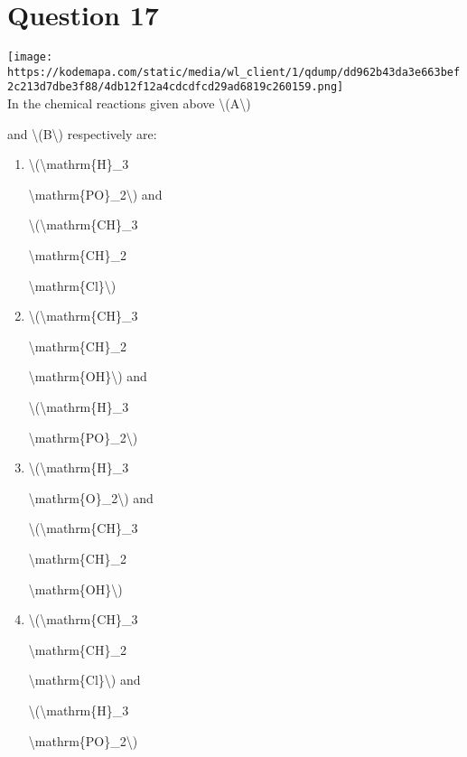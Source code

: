 \documentclass{article}
\begin{document}
\section*{Question 17}
\texttt{[image: https://kodemapa.com/static/media/wl\_client/1/qdump/dd962b43da3e663bef2c213d7dbe3f88/4db12f12a4cdcdfcd29ad6819c260159.png]}\\



In the chemical reactions given above \textbackslash(A\textbackslash)

and \textbackslash(B\textbackslash) respectively are:


\begin{enumerate}[label=(\alph*)]
\item \textbackslash(\textbackslash mathrm\{H\}\_3

\textbackslash mathrm\{PO\}\_2\textbackslash) and

\textbackslash(\textbackslash mathrm\{CH\}\_3

\textbackslash mathrm\{CH\}\_2

\textbackslash mathrm\{Cl\}\textbackslash)


\item \textbackslash(\textbackslash mathrm\{CH\}\_3

\textbackslash mathrm\{CH\}\_2

\textbackslash mathrm\{OH\}\textbackslash) and

\textbackslash(\textbackslash mathrm\{H\}\_3

\textbackslash mathrm\{PO\}\_2\textbackslash)


\item \textbackslash(\textbackslash mathrm\{H\}\_3

\textbackslash mathrm\{O\}\_2\textbackslash) and

\textbackslash(\textbackslash mathrm\{CH\}\_3

\textbackslash mathrm\{CH\}\_2

\textbackslash mathrm\{OH\}\textbackslash)


\item \textbackslash(\textbackslash mathrm\{CH\}\_3

\textbackslash mathrm\{CH\}\_2

\textbackslash mathrm\{Cl\}\textbackslash) and

\textbackslash(\textbackslash mathrm\{H\}\_3

\textbackslash mathrm\{PO\}\_2\textbackslash)


\end{enumerate}
\newpage
\end{document}
